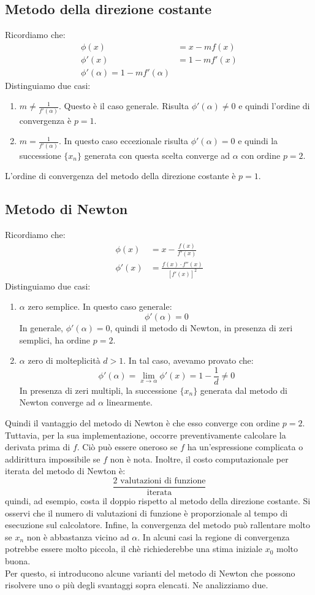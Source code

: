 \documentclass[12pt]{report}
\begin{document}
\subsection{Metodo della direzione costante}
Ricordiamo che:
\begin{align*}
	\phi(x) &= x - mf(x) \\
	\phi'(x) &= 1 - mf'(x) \\
	\phi'(\alpha) = 1 - mf'(\alpha)
\end{align*}
Distinguiamo due casi:
\begin{enumerate}
	\item $m \neq \frac{1}{f'(\alpha)}$. Questo è il caso generale. Risulta $\phi'(\alpha) \neq 0$ e quindi l'ordine di convergenza è $p = 1$.
	\item $ m = \frac{1}{f'(\alpha)}$.  In questo caso eccezionale risulta $\phi'(\alpha) = 0$ e quindi la successione $\{x_n\}$ generata con questa scelta converge ad $\alpha$ con ordine $p = 2$.
\end{enumerate}
L'ordine di convergenza del metodo della direzione costante è $p = 1$.
\subsection{Metodo di Newton}
Ricordiamo che:
\begin{align*}
\phi(x) &= x - \frac{f(x)}{f'(x)} \\
\phi'(x) &= \frac{f(x) \cdot f''(x)}{[f'(x)]^2}
\end{align*}
Distinguiamo due casi:
\begin{enumerate}
	\item $\alpha$ zero semplice. In questo caso generale:
	\[
	\phi'(\alpha) = 0
	\]
	In generale, $\phi'(\alpha) = 0$, quindi il metodo di Newton, in presenza di zeri semplici, ha ordine $p = 2$.
	\item $\alpha$ zero di molteplicità $d > 1$. In tal caso, avevamo provato che:
	\[
	\phi'(\alpha) = \lim\limits_{x\to\alpha}\phi'(x) = 1 - \frac{1}{d} \neq 0
	\]
	In presenza di zeri multipli, la successione $\{x_n\}$ generata dal metodo di Newton converge ad $\alpha$ linearmente.
\end{enumerate}
Quindi il vantaggio del metodo di Newton è che esso converge con ordine $p = 2$. Tuttavia, per la sua implementazione, occorre preventivamente calcolare la derivata prima di $f$. Ciò può essere oneroso se $f$ ha un'espressione complicata o addirittura impossibile se $f$ non è nota. Inoltre, il costo computazionale per iterata del metodo di Newton è:
\[
\frac{2\text{ valutazioni di funzione}}{\text{iterata}}
\]
quindi, ad esempio, costa il doppio rispetto al metodo della direzione costante. Si osservi che il numero di valutazioni di funzione è proporzionale al tempo di esecuzione sul calcolatore. Infine, la convergenza del metodo può rallentare molto se $x_n$ non è abbastanza vicino ad $\alpha$. In alcuni casi la regione di convergenza potrebbe essere molto piccola, il chè richiederebbe una stima iniziale $x_0$ molto buona.  \\
Per questo, si introducono alcune varianti del metodo di Newton che possono risolvere uno o più degli svantaggi sopra elencati. Ne analizziamo due.
\end{document}

